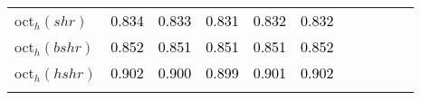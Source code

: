 \begin{tabular}[t]{l|>{}cccc>{}c|ccccc}
oct$_h(shr)$ & \textcolor{black}{0.834} & \textcolor{black}{0.833} & \textcolor{black}{0.831} & \textcolor{black}{0.832} & \textcolor{black}{0.832} &  &  &  &  & \\
oct$_h(bshr)$ & \textcolor{black}{0.852} & \textcolor{black}{0.851} & \textcolor{black}{0.851} & \textcolor{black}{0.851} & \textcolor{black}{0.852} &  &  &  &  & \\
oct$_h(hshr)$ & \textcolor{black}{0.902} & \textcolor{black}{0.900} & \textcolor{black}{0.899} & \textcolor{black}{0.901} & \textcolor{black}{0.902} &  &  &  &  & \\
\bottomrule
{}\\
\end{tabular}

